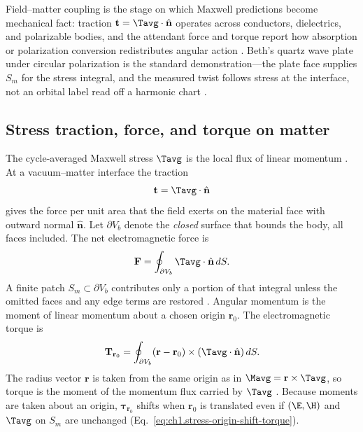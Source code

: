 Field--matter coupling is the stage on which Maxwell predictions become mechanical fact: traction $\mathbf{t}=\Tavg\cdot\hat{\mathbf{n}}$ operates across conductors, dielectrics, and polarizable bodies, and the attendant force and torque report how absorption or polarization conversion redistributes angular action \cite{beth1936}. Beth's quartz wave plate under circular polarization is the standard demonstration---the plate face supplies $S_m$ for the stress integral, and the measured twist follows stress at the interface, not an orbital label read off a harmonic chart \cite{beth1936,allen1992}.

\subsection{Stress traction, force, and torque on matter}
\label{sec:ch01.5.1}

The cycle-averaged Maxwell stress $\Tavg$ is the local flux of linear momentum \cite{maxwell1873,stratton1941}. At a vacuum--matter interface the traction
\begin{equation}
\label{eq:ch1.stress-traction-definition}
\mathbf{t}=\Tavg\cdot\hat{\mathbf{n}}
\end{equation}
gives the force per unit area that the field exerts on the material face with outward normal $\hat{\mathbf{n}}$. Let $\partial V_b$ denote the \emph{closed} surface that bounds the body, all faces included. The net electromagnetic force is
\begin{equation}
\label{eq:ch1.stress-force-integral}
\mathbf{F}=\oint_{\partial V_b}\Tavg\cdot\hat{\mathbf{n}}\,dS.
\end{equation}
A finite patch $S_m\subset\partial V_b$ contributes only a portion of that integral unless the omitted faces and any edge terms are restored \cite{stratton1941}. Angular momentum is the moment of linear momentum about a chosen origin $\mathbf{r}_0$. The electromagnetic torque is
\begin{equation}
\label{eq:ch1.stress-torque-integral}
\mathbf{T}_{\mathbf{r}_0}=\oint_{\partial V_b}(\mathbf{r}-\mathbf{r}_0)\times(\Tavg\cdot\hat{\mathbf{n}})\,dS.
\end{equation}
The radius vector $\mathbf{r}$ is taken from the same origin as in $\Mavg=\mathbf{r}\times\Tavg$, so torque is the moment of the momentum flux carried by $\Tavg$ \cite{stratton1941,beth1936}. Because moments are taken about an origin, $\boldsymbol{\tau}_{\mathbf{r}_0}$ shifts when $\mathbf{r}_0$ is translated even if $(\E,\H)$ and $\Tavg$ on $S_m$ are unchanged (Eq.~\eqref{eq:ch1.stress-origin-shift-torque}).

